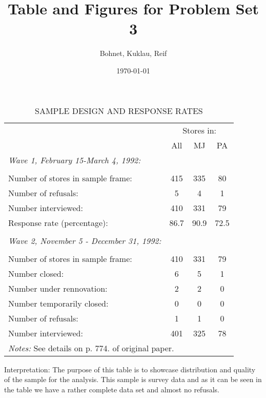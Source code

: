 \documentclass[11pt]{article}
\title{Table and Figures for Problem Set 3}
\author{Bohnet, Kuklau, Reif}
\date{\today}
\begin{document}
\maketitle









\begin{center}
	{
		\begin{table}[ht]
		\centering
		\caption{SAMPLE DESIGN AND RESPONSE RATES}\label{t_main}
		\setlength{\tabcolsep}{2.5pt}
		\begin{tabular}{@{}lccc@{}}
			\toprule \toprule
			 & \multicolumn{3}{c}{Stores in:} \\
			\cmidrule{2-4}
			& All & MJ & PA \\   \cmidrule{1-4}
			\emph{Wave 1, February 15-March 4, 1992:} \\
			\\
			Number of stores in sample frame: & 415 & 335 & 80\\
			Number of refusals: & 5 & 4 & 1\\
			Number interviewed: & 410 & 331 & 79\\
			Response rate (percentage): & 86.7 & 90.9 & 72.5\\
			\\
			\emph{Wave 2, November 5 - December 31, 1992:} \\
			\\
			Number of stores in sample frame: & 410 & 331 & 79\\
			Number closed: & 6 & 5 & 1\\
			Number under rennovation: & 2 & 2 & 0\\
			Number temporarily closed: & 0 & 0 & 0\\
			Number of refusals: & 1 & 1 & 0\\
			Number interviewed: & 401 & 325 & 78\\
			\bottomrule
			\multicolumn{4}{l}{\footnotesize{\textit{Notes:} See details on p. 774. of original paper.}}
		\end{tabular}
	\end{table}	

	}
\end{center}

Interpretation: The purpose of this table is to showcase distribution and quality of the sample for the analysis. This sample is survey data and as it can be seen in the table we have a rather complete data set and almost no refusals.
\end{document}
